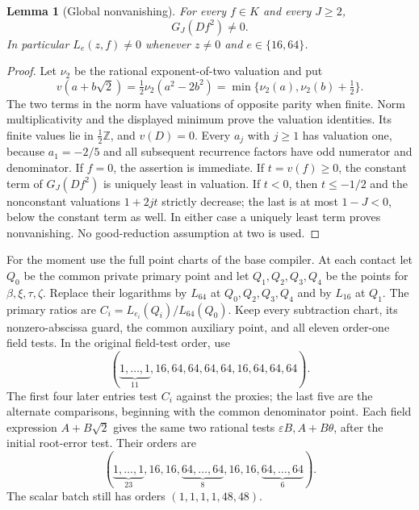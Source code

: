 \documentclass[11pt]{article}
\newtheorem{lemma}[theorem]{Lemma}
\theoremstyle{definition}
\theoremstyle{remark}
\newcommand{\Z}{\mathbb Z}
\begin{document}
\begin{lemma}[Global nonvanishing]
\label{lem:quartic-reciprocal-nonzero}
For every $f\in K$ and every $J\ge2$,
\[
                 G_J(Df^2)\ne0.
\]
In particular $L_e(z,f)\ne0$ whenever $z\ne0$ and $e\in\{16,64\}$.
\end{lemma}
\begin{proof}
Let $\nu_2$ be the rational exponent-of-two valuation and put
\[
 v(a+b\sqrt2)=\tfrac12\nu_2(a^2-2b^2)
             =\min\{\nu_2(a),\nu_2(b)+\tfrac12\}.
\]
The two terms in the norm have valuations of opposite parity when finite.
Norm multiplicativity and the displayed minimum prove the valuation
identities. Its finite values lie in $\tfrac12\Z$, and $v(D)=0$.
Every $a_j$ with $j\ge1$ has valuation one, because $a_1=-2/5$ and
all subsequent recurrence factors have odd numerator and denominator.
If $f=0$, the assertion is immediate. If $t=v(f)\ge0$, the constant
term of $G_J(Df^2)$ is uniquely least in valuation. If $t<0$, then
$t\le-1/2$ and the nonconstant valuations $1+2jt$ strictly decrease;
the last is at most $1-J<0$, below the constant term as well. In either
case a uniquely least term proves nonvanishing. No good-reduction
assumption at two is used.
\end{proof}

For the moment use the full point charts of the base compiler. At each
contact let $Q_0$ be the common private primary point and let $Q_1,Q_2,Q_3,Q_4$
be the points for $\beta,\xi,\tau,\zeta$. Replace their logarithms by
$L_{64}$ at $Q_0,Q_2,Q_3,Q_4$ and by $L_{16}$ at $Q_1$.
The primary ratios are $C_i=L_{e_i}(Q_i)/L_{64}(Q_0)$.
Keep every subtraction chart, its nonzero-abscissa guard, the common
auxiliary point, and all eleven order-one field tests. In the original
field-test order, use
\[
 (\underbrace{1,\ldots,1}_{11},16,64,64,64,64,16,64,64,64).
\]
The first four later entries test $C_i$ against the proxies; the last
five are the alternate comparisons, beginning with the common denominator
point. Each field expression $A+B\sqrt2$ gives the same two rational tests
$\varepsilon B,A+B\theta$, after the initial root-error test. Their orders are
\[
 (\underbrace{1,\ldots,1}_{23},16,16,
   \underbrace{64,\ldots,64}_{8},16,16,
   \underbrace{64,\ldots,64}_{6}).
\]
The scalar batch still has orders $(1,1,1,1,48,48)$.
\end{document}
